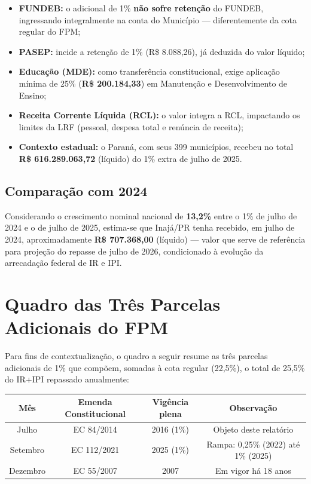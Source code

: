 \documentclass[12pt,a4paper]{article}
\begin{document}
\begin{itemize}[leftmargin=2.5em]
  \item \textbf{FUNDEB:} o adicional de 1\% \textbf{não sofre retenção} do FUNDEB, ingressando integralmente na conta do Município --- diferentemente da cota regular do FPM;
  \item \textbf{PASEP:} incide a retenção de 1\% (R\$ 8.088,26), já deduzida do valor líquido;
  \item \textbf{Educação (MDE):} como transferência constitucional, exige aplicação mínima de 25\% (\textbf{R\$ 200.184,33}) em Manutenção e Desenvolvimento de Ensino;
  \item \textbf{Receita Corrente Líquida (RCL):} o valor integra a RCL, impactando os limites da LRF (pessoal, despesa total e renúncia de receita);
  \item \textbf{Contexto estadual:} o Paraná, com seus 399 municípios, recebeu no total \textbf{R\$ 616.289.063,72} (líquido) do 1\% extra de julho de 2025.
\end{itemize}

\subsection{Comparação com 2024}

Considerando o crescimento nominal nacional de \textbf{13,2\%} entre o 1\% de julho de 2024 e o de julho de 2025, estima-se que Inajá/PR tenha recebido, em julho de 2024, aproximadamente \textbf{R\$ 707.368,00} (líquido) --- valor que serve de referência para projeção do repasse de julho de 2026, condicionado à evolução da arrecadação federal de IR e IPI.

\section{Quadro das Três Parcelas Adicionais do FPM}

Para fins de contextualização, o quadro a seguir resume as três parcelas adicionais de 1\% que compõem, somadas à cota regular (22,5\%), o total de 25,5\% do IR+IPI repassado anualmente:

\begin{center}
\renewcommand{\arraystretch}{1.3}
\begin{tabular}{@{}c c c c@{}}
\toprule
\textbf{Mês} & \textbf{Emenda Constitucional} & \textbf{Vigência plena} & \textbf{Observação} \\
\midrule
Julho & EC 84/2014 & 2016 (1\%) & Objeto deste relatório \\
Setembro & EC 112/2021 & 2025 (1\%) & Rampa: 0,25\% (2022) até 1\% (2025) \\
Dezembro & EC 55/2007 & 2007 & Em vigor há 18 anos \\
\bottomrule
\end{tabular}
\end{center}
\end{document}
